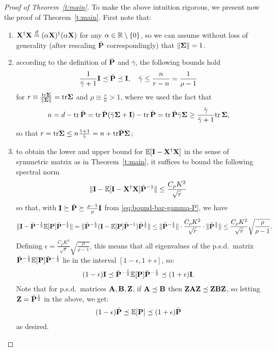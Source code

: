\documentclass[11pt]{article}
\begin{document}
\begin{proof}[Proof of Theorem~\ref{t:main}]
To make the above intuition rigorous, we present now the proof of Theorem~\ref{t:main}. First note that:
\begin{enumerate}
  \item  $\X^\dag \X \overset{d}{=} (\alpha \X)^\dag (\alpha \X)$ for any $\alpha \in \R \setminus \{0\}$, so we can assume without loss of generality (after rescaling $\bar{\P}$ correspondingly) that $\|\Sigmab\| = 1$.
  \item according to the definition of $\bar \P$ and $\bar \gamma$, the following bounds hold
  \begin{equation}\label{eq:bound-bar-gamma-P}
    \frac1{\bar \gamma + 1} \I \preceq \bar \P \preceq \I, \quad \bar \gamma \le \frac{n}{r-n} = \frac1{\rho - 1}
  \end{equation}
  for $r \equiv \frac{\tr \Sigmab}{ \| \Sigmab \| } = \tr \Sigmab$ and $\rho \equiv \frac{r}{n} > 1$, where we used the fact that
  \[
    n = d - \tr\,\bar\P = \tr\,\bar\P (\bar\gamma\Sigmab + \I) - \tr\,\bar\P
  = \tr\,\bar\P \bar\gamma\Sigmab\geq \frac{\bar\gamma}{\bar\gamma+1}\tr\,\Sigmab,
  \]
  so that $r = \tr \Sigmab \le n\frac{\bar \gamma + 1}{\bar \gamma} = n + \tr \bar \P \Sigmab$;
  \item to obtain the lower and upper bound for $\E[\I - \X^\dagger \X]$ in the sense of symmetric matrix as in Theorem~\ref{t:main}, it suffices to bound the following spectral norm
  \begin{equation}\label{eq:proof-1}
    \| \I - \E[\I - \X^\dagger \X] \bar \P^{-1} \| \le \frac{C_\rho K^2}{\sqrt r}
  \end{equation}
  so that, with $\I\succeq\bar\P\succeq \frac{\rho-1}{\rho}\I$ from \eqref{eq:bound-bar-gamma-P}, we have
  \begin{align*}
    \|\I-\bar\P^{-\frac12}\E[\P]\bar\P^{-\frac12}\| =
    \|\bar\P^{-\frac12}(\I-\E[\P]\bar\P^{-1})\bar\P^{\frac12}\|\leq
  \|\bar\P^{-\frac12}\|\cdot\frac{C_\rho K^2}{\sqrt r}\cdot \|\bar\P^{\frac12}\|\leq
  \frac{C_\rho K^2}{\sqrt r} \sqrt{\frac{\rho}{\rho-1}}.
  \end{align*}
  Defining $\epsilon =\frac{C_\rho K^2}{\sqrt r}
  \sqrt{\frac{\rho}{\rho-1}}$, this means that all eigenvalues 
  of the p.s.d.~matrix $\bar\P^{-\frac12}\E[\P]\bar\P^{-\frac12}$ lie
  in the interval $[1-\epsilon,1+\epsilon]$, so:
  \begin{align*}
    (1-\epsilon)\I\preceq
    \bar\P^{-\frac12}\E[\P]\bar\P^{-\frac12}\preceq (1+\epsilon)\I.
  \end{align*}
  Note that for p.s.d.~matrices $\A,\B,\Z$, if $\A\preceq \B$ then
  $\Z\A\Z\preceq \Z\B\Z$, so letting $\Z=\bar\P^{\frac12}$ in the above,
  we get:
  \begin{align*}
    (1-\epsilon)\bar\P\preceq
    \E[\P]\preceq (1+\epsilon)\bar\P
  \end{align*}
  as desired.
\end{enumerate}


\end{proof}
\end{document}
